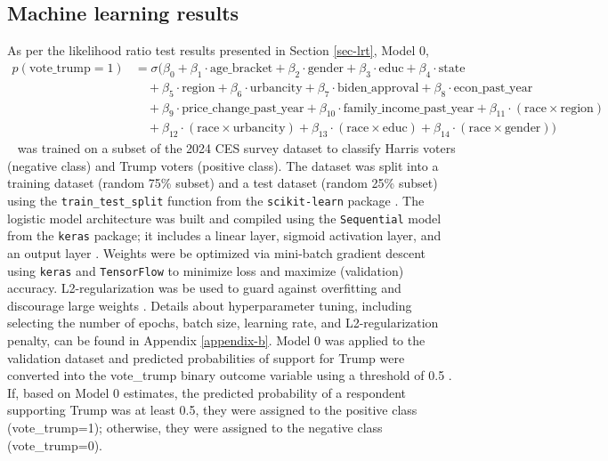 \documentclass[letter]{article}
\begin{document}
\subsection{Machine learning results} \label{sec-mlmodel}
As per the likelihood ratio test results presented in Section \ref{sec-lrt}, Model 0,
\texttt{
\begin{align*}
p(\text{vote\_trump} = 1) &= \sigma\Big(
  \beta_0
  + \beta_1 \cdot \text{age\_bracket}
  + \beta_2 \cdot \text{gender}
  + \beta_3 \cdot \text{educ}
  + \beta_4 \cdot \text{state} \\
  &\quad + \beta_5 \cdot \text{region}
  + \beta_6 \cdot \text{urbancity}
  + \beta_7 \cdot \text{biden\_approval}
  + \beta_8 \cdot \text{econ\_past\_year} \\
  &\quad + \beta_9 \cdot \text{price\_change\_past\_year}
  + \beta_{10} \cdot \text{family\_income\_past\_year}
  + \beta_{11} \cdot (\text{race} \times \text{region}) \\
  &\quad + \beta_{12} \cdot (\text{race} \times \text{urbancity})
  + \beta_{13} \cdot (\text{race} \times \text{educ})
  + \beta_{14} \cdot (\text{race} \times \text{gender})
\Big)
\end{align*}
} was trained on a subset of the 2024 CES survey dataset to classify Harris voters (negative class) and Trump voters (positive class). The dataset was split into a training dataset (random 75\% subset) and a test dataset (random 25\% subset) using the \texttt{train\_test\_split} function from the \texttt{scikit-learn} package \cite{scikit-learn}. The logistic model architecture was built and compiled using the \texttt{Sequential} model from the \texttt{keras} package; it includes a linear layer, sigmoid activation layer, and an output layer \cite{keras}. Weights were be optimized via mini-batch gradient descent using \texttt{keras} and \texttt{TensorFlow} to minimize loss and maximize (validation) accuracy. L2-regularization was be used to guard against overfitting and discourage large weights \cite{google-dev}. Details about hyperparameter tuning, including selecting the number of epochs, batch size, learning rate, and L2-regularization penalty, can be found in Appendix \ref{appendix-b}. Model 0 was applied to the validation dataset and predicted probabilities of support for Trump were converted into the vote\_trump binary outcome variable using a threshold of 0.5 \cite{camatarri}. If, based on Model 0 estimates, the predicted probability of a respondent supporting Trump was at least 0.5, they were assigned to the positive class (vote\_trump=1); otherwise, they were assigned to the negative class (vote\_trump=0). \\
\end{document}
